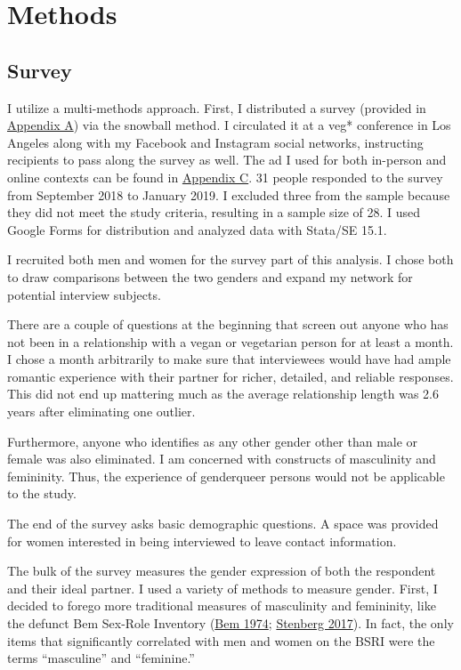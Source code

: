 \documentclass[twoside]{report}
\let\oldsection\section
\renewcommand\section{\clearpage\oldsection}
\begin{document}
\section{Methods}

\subsection{Survey}

I utilize a multi-methods approach. First, I distributed a survey
(provided in \hyperlink{appendix-a}{Appendix A}) via the snowball method. I circulated it at a
veg* conference in Los Angeles along with my Facebook and Instagram social networks, instructing recipients to pass along the survey as well. The ad I used for both in-person and online contexts can be found in \hyperlink{appendix-c}{Appendix C}. 31 people responded to the survey from September 2018 to January 2019. I excluded
three from the sample because they did not meet the study criteria,
resulting in a sample size of 28. I used Google Forms for distribution
and analyzed data with Stata/SE 15.1.

I recruited both men and women for the survey part of this analysis. I
chose both to draw comparisons between the two genders and expand my
network for potential interview subjects. 

There are a couple of questions at the beginning that screen out anyone who has not been in a relationship with a vegan or vegetarian person for at least a month. I chose a month arbitrarily to make sure that interviewees would have had ample romantic experience with their partner for richer, detailed, and reliable responses. This did not end up mattering much as the average relationship length was 2.6 years after eliminating one outlier. 

Furthermore, anyone who identifies as any other gender other than male or female was also eliminated. I am concerned with constructs of masculinity and femininity. Thus, the experience of genderqueer persons would not be applicable to the study. 

The end of the survey asks basic demographic questions. A space was provided for women interested in being interviewed to leave contact information.

The bulk of the survey measures the gender expression of both the
respondent and their ideal partner. I used a variety of methods to
measure gender. First, I decided to forego more traditional measures of
masculinity and femininity, like the defunct Bem Sex-Role Inventory (\hyperlink{bem}{Bem 1974}; \hyperlink{stenberg}{Stenberg 2017}). In fact, the only items that
significantly correlated with men and women on the BSRI were the terms
``masculine'' and ``feminine.''
\end{document}
